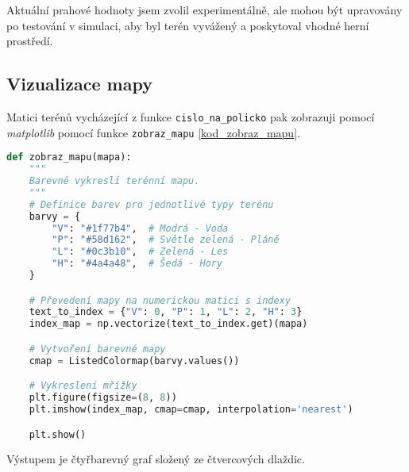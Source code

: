 Aktuální prahové hodnoty jsem zvolil experimentálně, ale mohou být upravovány po testování v simulaci, aby byl terén vyvážený a poskytoval vhodné herní prostředí.

\subsection{Vizualizace mapy}

Matici terénů vycházející z funkce \texttt{cislo\_na\_policko} pak zobrazuji pomocí \textit{matplotlib} pomocí funkce \texttt{zobraz\_mapu} \ref{kod_zobraz_mapu}.

\begin{lstlisting}[language=Python, caption=Kód generující pole pro náhodnou mapu, label=kod_zobraz_mapu]
def zobraz_mapu(mapa):
    """
    Barevně vykreslí terénní mapu.
    """
    # Definice barev pro jednotlivé typy terénu
    barvy = {
        "V": "#1f77b4",  # Modrá - Voda
        "P": "#58d162",  # Světle zelená - Pláně
        "L": "#0c3b10",  # Zelená - Les
        "H": "#4a4a48",  # Šedá - Hory
    }

    # Převedení mapy na numerickou matici s indexy
    text_to_index = {"V": 0, "P": 1, "L": 2, "H": 3}
    index_map = np.vectorize(text_to_index.get)(mapa)

    # Vytvoření barevné mapy
    cmap = ListedColormap(barvy.values())

    # Vykreslení mřížky
    plt.figure(figsize=(8, 8))
    plt.imshow(index_map, cmap=cmap, interpolation='nearest')

    plt.show()

\end{lstlisting}

Výstupem je čtyřbarevný graf složený ze čtvercových dlaždic.

